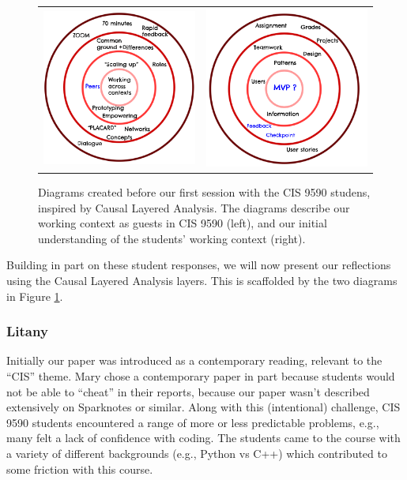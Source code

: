 \documentclass[acmlarge,timestamp]{acmart}
\begin{document}
\begin{figure}[h]
  \begin{tabular}{cc}
    \includegraphics[width=.45\textwidth]{UsCLA.png} &
    \includegraphics[width=.45\textwidth]{ThemCLA.png}
  \end{tabular}
\caption{Diagrams created before our first session with the CIS 9590 studens, inspired by Causal Layered Analysis.  The diagrams describe our working context as guests in CIS 9590 (left), and our initial understanding of the students’ working context (right).\label{cis-9590-anticipations}}
\end{figure}

Building in part on these student responses, we will now present our
reflections using the Causal Layered Analysis layers.  This is
scaffolded by the two diagrams in Figure \ref{cis-9590-anticipations}.

\subsubsection{Litany}
Initially our paper was introduced as a contemporary reading, relevant
to the “CIS” theme.  Mary chose a contemporary paper in part because
students would not be able to “cheat” in their reports, because our
paper wasn’t described extensively on Sparknotes or similar.  Along
with this (intentional) challenge, CIS 9590 students encountered a
range of more or less predictable problems, e.g., many felt a lack of
confidence with coding.  The students came to the course with a
variety of different backgrounds (e.g., Python vs C++) which
contributed to some friction with this course.
\end{document}
